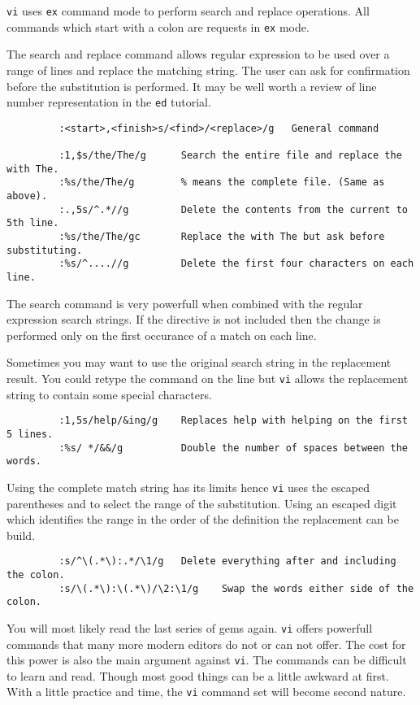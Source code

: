        {\tt vi} uses {\tt ex} command mode to perform search and replace
operations. All commands which start with a colon are requests in {\tt ex} 
mode. 

The search and replace command allows regular expression to be used over
a range of lines and replace the matching string. The user can ask for
confirmation before the substitution is performed. It may be well worth
a review of line number representation in the {\tt ed} tutorial.
\begin{verbatim}
         :<start>,<finish>s/<find>/<replace>/g   General command

         :1,$s/the/The/g      Search the entire file and replace the with The.
         :%s/the/The/g        % means the complete file. (Same as above).
         :.,5s/^.*//g         Delete the contents from the current to 5th line.
         :%s/the/The/gc       Replace the with The but ask before substituting.
         :%s/^....//g         Delete the first four characters on each line.
\end{verbatim}

The search command is very powerfull when combined with the regular expression
search strings. If the  directive is not included then the change is
performed only on the first occurance of a match on each line. 

Sometimes you may want to use the original search string in the replacement
result. You could retype the command on the line but {\tt vi} allows 
the replacement string to contain some special characters.
\begin{verbatim}
         :1,5s/help/&ing/g    Replaces help with helping on the first 5 lines.
         :%s/ */&&/g          Double the number of spaces between the words.
\end{verbatim}

Using the complete match string has its limits hence {\tt vi} uses the
escaped parentheses \key{\\(} and \key{\\)} to select the range of the
substitution.  Using an escaped digit  which identifies the
range in the order of the definition the replacement can be build.
\begin{verbatim}
         :s/^\(.*\):.*/\1/g   Delete everything after and including the colon.
         :s/\(.*\):\(.*\)/\2:\1/g    Swap the words either side of the colon.
\end{verbatim}

You will most likely read the last series of gems again. {\tt vi}
offers powerfull commands that many more modern editors do not or can
not offer.  The cost for this power is also the main argument against
{\tt vi}. The commands can be difficult to learn and read. Though most
good things can be a little awkward at first.  With a little practice
and time, the {\tt vi} command set will become second nature.

